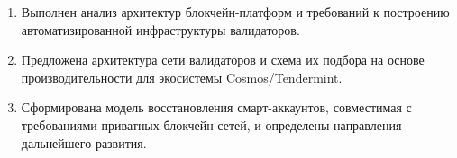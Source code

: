 \begin{enumerate}
  \item Выполнен анализ архитектур блокчейн-платформ и требований к построению
  автоматизированной инфраструктуры валидаторов.
  \item Предложена архитектура сети валидаторов и схема их подбора на основе
  производительности для экосистемы Cosmos/Tendermint.
  \item Сформирована модель восстановления смарт-аккаунтов, совместимая с
  требованиями приватных блокчейн-сетей, и определены направления дальнейшего
  развития.
\end{enumerate}
